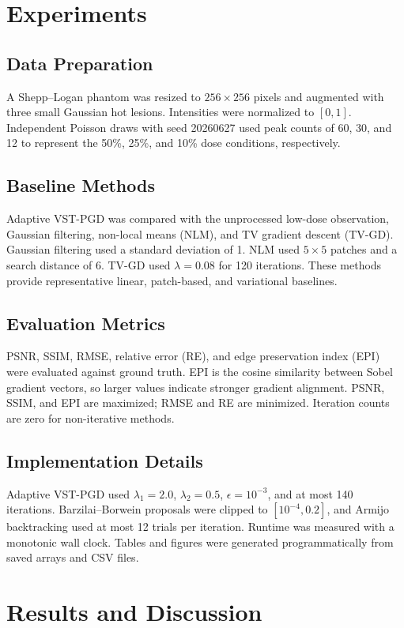 \FloatBarrier
\section{Experiments}
\subsection{Data Preparation}
A Shepp--Logan phantom was resized to $256\times256$ pixels and augmented with three small Gaussian hot lesions. Intensities were normalized to $[0,1]$. Independent Poisson draws with seed 20260627 used peak counts of 60, 30, and 12 to represent the 50\%, 25\%, and 10\% dose conditions, respectively.

\subsection{Baseline Methods}
Adaptive VST-PGD was compared with the unprocessed low-dose observation, Gaussian filtering, non-local means (NLM), and TV gradient descent (TV-GD). Gaussian filtering used a standard deviation of 1. NLM used $5\times5$ patches and a search distance of 6. TV-GD used $\lambda=0.08$ for 120 iterations. These methods provide representative linear, patch-based, and variational baselines.

\subsection{Evaluation Metrics}
PSNR, SSIM, RMSE, relative error (RE), and edge preservation index (EPI) were evaluated against ground truth. EPI is the cosine similarity between Sobel gradient vectors, so larger values indicate stronger gradient alignment. PSNR, SSIM, and EPI are maximized; RMSE and RE are minimized. Iteration counts are zero for non-iterative methods.

\subsection{Implementation Details}
Adaptive VST-PGD used $\lambda_1=2.0$, $\lambda_2=0.5$, $\epsilon=10^{-3}$, and at most 140 iterations. Barzilai--Borwein proposals were clipped to $[10^{-4},0.2]$, and Armijo backtracking used at most 12 trials per iteration. Runtime was measured with a monotonic wall clock. Tables and figures were generated programmatically from saved arrays and CSV files.

\section{Results and Discussion}
